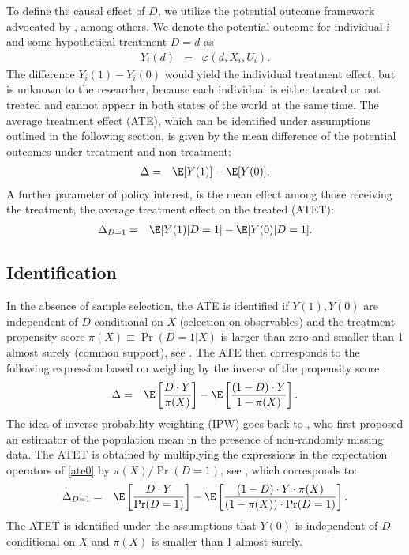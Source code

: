 \documentclass[nojss]{jss}
\begin{document}
To define the causal effect of $D$, we utilize the potential outcome framework advocated by \citet{Rubin74}, among others. We denote the potential outcome for individual $i$ and some hypothetical treatment $D=d$ as
\begin{eqnarray}
Y_{i}(d) &=&\varphi (d,X_{i},U_{i})\text{.}
\end{eqnarray}%
The difference $Y_{i}(1)-Y_{i}(0)$ would yield the individual treatment effect, but is unknown to the researcher, because each individual is either treated or not treated and cannot appear in both states of the world at the same time. The average treatment effect (ATE), which can be identified under assumptions outlined in the following section, is given by the mean difference of the potential outcomes under treatment and non-treatment:
\begin{eqnarray}
\Delta &=&\E[Y(1)]-\E[Y(0)].
\end{eqnarray}
A further parameter of policy interest, is the mean effect among those receiving the treatment, the average treatment effect on the treated (ATET):
\begin{eqnarray}
\Delta_{D=1}&=&\E[Y(1)|D=1]-\E[Y(0)|D=1].
\end{eqnarray}

\subsection{Identification}

In the absence of sample selection, the ATE is identified if $Y(1), Y(0)$ are independent of $D$ conditional on $X$ (selection on observables) and the treatment propensity score  $\pi(X) \equiv \Pr(D=1|X)$ is larger than zero and smaller than 1 almost surely (common support), see \citet{ImWo08}. The ATE then corresponds to the following expression based on weighing by the inverse of the propensity score:
\begin{eqnarray}
\Delta &=& \E\left[ \frac{D \cdot Y}{\pi(X)} \right] - \E\left[ \frac{(1-D)\cdot Y}{1-\pi(X)} \right].  \label{ate0}
\end{eqnarray}%
The idea of inverse probability weighting (IPW) goes back to \citet{HoTh52}, who first proposed an estimator of the population mean in the presence of non-randomly missing data. The ATET is obtained by multiplying the expressions in the expectation operators of \eqref{ate0} by $\pi(X)/\Pr(D=1)$, see \citet{Hirano+00}, which corresponds to:
\begin{eqnarray}
\Delta_{D=1} &=& \E\left[ \frac{D \cdot Y}{\Pr(D=1)} \right] - \E\left[ \frac{(1-D)\cdot Y\cdot \pi(X)}{(1-\pi(X))\cdot\Pr(D=1)} \right].  \label{atet0}
\end{eqnarray}
The ATET is identified under the assumptions that $Y(0)$ is independent of $D$ conditional on $X$ and $\pi(X)$ is smaller than 1 almost surely.
\end{document}
